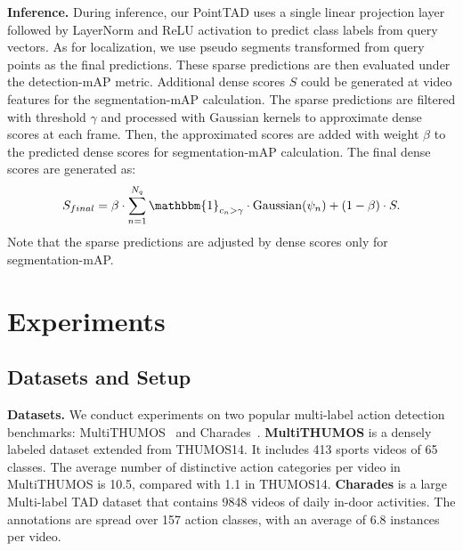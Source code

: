 \documentclass{article}
\renewcommand{\paragraph}[1]{\vspace{1.25mm}\noindent\textbf{#1}}
\begin{document}
\paragraph{Inference.}
During inference, our PointTAD uses a single linear projection layer followed by LayerNorm and ReLU activation to predict class labels from query vectors. As for localization, we use pseudo segments transformed from query points as the final predictions. These sparse predictions are then evaluated under the detection-mAP metric. Additional dense scores $S$ could be generated at video features for the segmentation-mAP calculation. 
The sparse predictions are filtered with threshold $\gamma$ and processed with Gaussian kernels to approximate dense scores at each frame. Then, the approximated scores are added with weight $\beta$ to the predicted dense scores for segmentation-mAP calculation. The final dense scores are generated as:
\begin{align}
    S_{final} = \beta \cdot \sum_{n=1}^{N_q}{\mathbbm{1}_{c_n > \gamma} \cdot {\rm Gaussian}(\psi_n)}+ (1-\beta) \cdot S.
    \label{eq:sparse2dense}
\end{align}
Note that the sparse predictions are adjusted by dense scores only for segmentation-mAP.

\section{Experiments}
\vspace{-0.3em}
\subsection{Datasets and Setup}
\vspace{-0.3em}
\paragraph{Datasets.}
We conduct experiments on two popular multi-label action detection benchmarks: MultiTHUMOS~\cite{DBLP:journals/ijcv/YeungRJAMF18} and Charades~\cite{DBLP:conf/eccv/SigurdssonVWFLG16}. {\bf MultiTHUMOS} is a densely labeled dataset extended from THUMOS14. It includes 413 sports videos of 65 classes. The average number of distinctive action categories per video in MultiTHUMOS is 10.5, compared with 1.1 in THUMOS14. {\bf Charades} is a large Multi-label TAD dataset that contains 9848 videos of daily in-door activities. The annotations are spread over 157 action classes, with an average of 6.8 instances per video.
\end{document}
